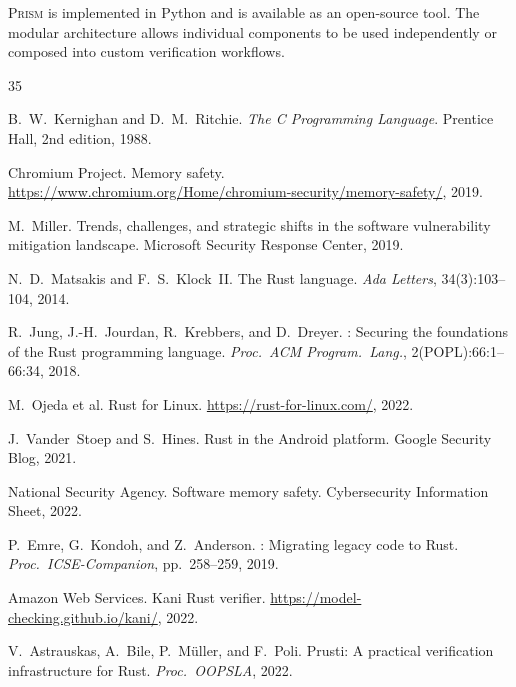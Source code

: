 \documentclass[11pt,a4paper]{article}
\begin{document}
\textsc{Prism} is implemented in Python and is available as an
open-source tool. The modular architecture allows individual
components to be used independently or composed into custom
verification workflows.




\begin{thebibliography}{35}

B.~W.~Kernighan and D.~M.~Ritchie.
\newblock \emph{The C Programming Language}.
\newblock Prentice Hall, 2nd edition, 1988.

Chromium Project.
\newblock Memory safety.
\newblock \url{https://www.chromium.org/Home/chromium-security/memory-safety/}, 2019.

M.~Miller.
\newblock Trends, challenges, and strategic shifts in the software vulnerability mitigation landscape.
\newblock Microsoft Security Response Center, 2019.

N.~D.~Matsakis and F.~S.~Klock~II.
\newblock The {Rust} language.
\newblock \emph{Ada Letters}, 34(3):103--104, 2014.

R.~Jung, J.-H.~Jourdan, R.~Krebbers, and D.~Dreyer.
: Securing the foundations of the {Rust} programming language.
\newblock \emph{Proc.\ ACM Program.\ Lang.}, 2(POPL):66:1--66:34, 2018.

M.~Ojeda et al.
\newblock Rust for {Linux}.
\newblock \url{https://rust-for-linux.com/}, 2022.

J.~Vander~Stoep and S.~Hines.
\newblock Rust in the {Android} platform.
\newblock Google Security Blog, 2021.

National Security Agency.
\newblock Software memory safety.
\newblock Cybersecurity Information Sheet, 2022.

P.~Emre, G.~Kondoh, and Z.~Anderson.
: Migrating legacy code to {Rust}.
\newblock \emph{Proc.\ ICSE-Companion}, pp.\ 258--259, 2019.

Amazon Web Services.
\newblock Kani {Rust} verifier.
\newblock \url{https://model-checking.github.io/kani/}, 2022.

V.~Astrauskas, A.~Bi\-le, P.~M\"uller, and F.~Poli.
\newblock Prusti: A practical verification infrastructure for {Rust}.
\newblock \emph{Proc.\ OOPSLA}, 2022.


\end{thebibliography}
\end{document}
